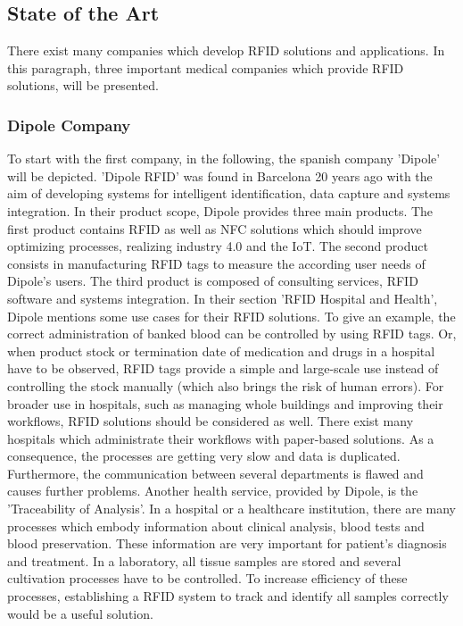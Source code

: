 \subsection{State of the Art}

There exist many companies which develop \ac{RFID} solutions and applications. In this paragraph, three important medical companies which provide RFID solutions, will be presented.

\subsubsection{Dipole Company}

To start with the first company, in the following, the spanish company 'Dipole' \cite{dipole} will be depicted. 'Dipole RFID' was found in Barcelona 20 years ago with the aim of developing systems for intelligent identification, data capture and systems integration. In their product scope, Dipole provides three main products. The first product contains RFID as well as \ac{NFC} solutions which should improve optimizing processes, realizing industry 4.0 and the \ac{IoT}. The second product consists in manufacturing RFID tags to measure the according user needs of Dipole's users. The third product is composed of consulting services, RFID software and systems integration.
In their section 'RFID Hospital and Health', Dipole mentions some use cases for their RFID solutions. To give an example, the correct administration of banked blood can be controlled by using RFID tags. Or, when product stock or termination date of medication and drugs in a hospital have to be observed, RFID tags provide a simple and large-scale use instead of controlling the stock manually (which also brings the risk of human errors). For broader use in hospitals, such as managing whole buildings and improving their workflows, RFID solutions should be considered as well. There exist many hospitals which administrate their workflows with paper-based solutions. As a consequence, the processes are getting very slow and data is duplicated. Furthermore, the communication between several departments is flawed and causes further problems.
Another health service, provided by Dipole, is the 'Traceability of Analysis'. In a hospital or a healthcare institution, there are many processes which embody information about clinical analysis, blood tests and blood preservation. These information are very important for patient's diagnosis and treatment. In a laboratory, all tissue samples are stored and several cultivation processes have to be controlled. To increase efficiency of these processes, establishing a RFID system to track and identify all samples correctly would be a useful solution.

